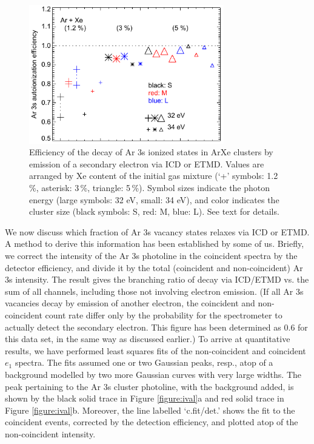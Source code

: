 \documentclass[journal=jpccck,manuscript=article]{achemso}
\begin{document}
\begin{figure}[ht]
 \centering
 \includegraphics[width=8.5cm]{figure_eff.pdf}
 \caption{
Efficiency of the decay of Ar 3s ionized states in ArXe clusters by emission of a secondary electron via ICD or ETMD. Values are arranged by Xe content of the initial gas mixture (`+' symbols: 1.2\,\%, asterisk: 3\,\%, triangle: 5\,\%). Symbol sizes indicate the photon energy (large symbols: 32 eV, small: 34 eV), and color indicates the cluster size (black symbols: S, red: M, blue: L). See text for details.
}
 \label{figure:eff}
\end{figure}
%
We now discuss which fraction of Ar 3s vacancy states relaxes via ICD or ETMD.
A method to derive this information has been established by some of us.\cite{foerstel_2013}
Briefly, we correct the intensity of the Ar 3s photoline in the coincident spectra by the detector efficiency, and divide it by the total (coincident and non-coincident) Ar 3s intensity.
The result gives the branching ratio of decay via ICD/ETMD vs. the sum of all channels, including those not involving electron emission.
(If all Ar 3s vacancies decay by emission of another electron, the coincident and non-coincident count rate differ only by the probability for the spectrometer to actually detect the secondary electron.
This figure has been determined as 0.6 for this data set, in the same way as discussed earlier.\cite{mucke_review})
To arrive at quantitative results, we have performed least squares fits of the non-coincident and coincident $e_1$ spectra.
The fits assumed one or two Gaussian peaks, resp., atop of a background modelled by two more Gaussian curves with very large widths.
The peak pertaining to the Ar 3s cluster photoline, with the background added, is shown by the black solid trace in Figure \ref{figure:ival}a and red solid trace in Figure \ref{figure:ival}b.
Moreover, the line labelled `c.fit/det.' shows the fit to the coincident events, corrected by the detection efficiency, and plotted atop of the non-coincident intensity. 
\end{document}
